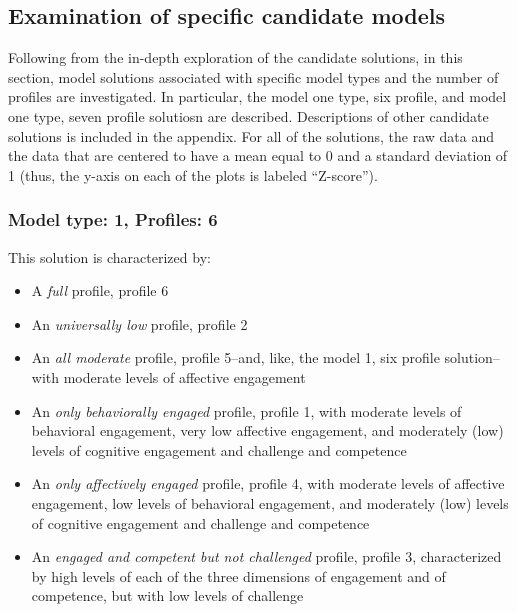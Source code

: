\documentclass[]{msu-thesis}
\providecommand{\tightlist}{%
  \setlength{\itemsep}{0pt}\setlength{\parskip}{0pt}}
\theoremstyle{definition}
\theoremstyle{definition}
\theoremstyle{definition}
\theoremstyle{remark}
\begin{document}
\subsection{Examination of specific candidate
models}\label{examination-of-specific-candidate-models}

Following from the in-depth exploration of the candidate solutions, in
this section, model solutions associated with specific model types and
the number of profiles are investigated. In particular, the model one
type, six profile, and model one type, seven profile solutiosn are
described. Descriptions of other candidate solutions is included in the
appendix. For all of the solutions, the raw data and the data that are
centered to have a mean equal to 0 and a standard deviation of 1 (thus,
the y-axis on each of the plots is labeled ``Z-score'').

\subsubsection{Model type: 1, Profiles:
6}\label{model-type-1-profiles-6}

This solution is characterized by:

\begin{itemize}
\tightlist
\item
  A \emph{full} profile, profile 6
\item
  An \emph{universally low} profile, profile 2
\item
  An \emph{all moderate} profile, profile 5--and, like, the model 1, six
  profile solution--with moderate levels of affective engagement
\item
  An \emph{only behaviorally engaged} profile, profile 1, with moderate
  levels of behavioral engagement, very low affective engagement, and
  moderately (low) levels of cognitive engagement and challenge and
  competence
\item
  An \emph{only affectively engaged} profile, profile 4, with moderate
  levels of affective engagement, low levels of behavioral engagement,
  and moderately (low) levels of cognitive engagement and challenge and
  competence
\item
  An \emph{engaged and competent but not challenged} profile, profile 3,
  characterized by high levels of each of the three dimensions of
  engagement and of competence, but with low levels of challenge
\end{itemize}
\end{document}
